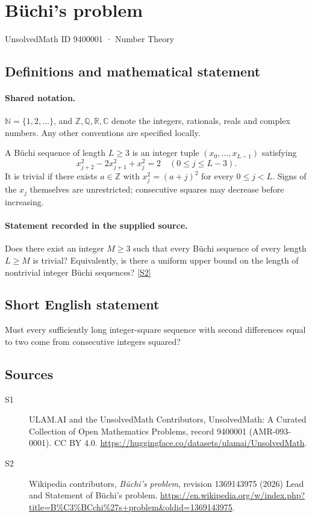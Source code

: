 \documentclass[11pt]{article}
\newcommand{\sref}[2]{\hyperlink{source:#1:#2}{[S#2]}}
\begin{document}
\setcounter{section}{9400000}
\section{Büchi's problem}\label{9400001}
{\small\sffamily UnsolvedMath ID 9400001 · Number Theory}
\subsection{Definitions and mathematical statement}

\paragraph{Shared notation.}$\mathbb N=\{1,2,\ldots\}$, and $\mathbb Z,\mathbb Q,\mathbb R,\mathbb C$ denote the integers, rationals, reals and complex numbers. Any other conventions are specified locally.


A B\"uchi sequence of length $L\ge3$ is an integer tuple $(x_0,\ldots,x_{L-1})$ satisfying
\[
x_{j+2}^2-2x_{j+1}^2+x_j^2=2\quad(0\le j\le L-3).
\]
It is trivial if there exists $a\in\mathbb Z$ with $x_j^2=(a+j)^2$ for every $0\le j<L$. Signs of the $x_j$ themselves are unrestricted; consecutive squares may decrease before increasing.
\paragraph{Statement recorded in the supplied source.}
Does there exist an integer $M\ge3$ such that every B\"uchi sequence of every length $L\ge M$ is trivial? Equivalently, is there a uniform upper bound on the length of nontrivial integer B\"uchi sequences? \sref{9400001}{2}
\subsection{Short English statement}
Must every sufficiently long integer-square sequence with second differences equal to two come from consecutive integers squared?
\subsection{Sources}
\begin{description}
\item[\hypertarget{source:9400001:1}{S1}] ULAM.AI and the UnsolvedMath Contributors, UnsolvedMath: A Curated Collection of Open Mathematics Problems, record 9400001 (AMR-093-0001). CC BY 4.0. \url{https://huggingface.co/datasets/ulamai/UnsolvedMath}.
\item[\hypertarget{source:9400001:2}{S2}] Wikipedia contributors, \emph{Büchi's problem}, revision 1369143975 (2026) Lead and Statement of Büchi’s problem. \url{https://en.wikipedia.org/w/index.php?title=B%C3%BCchi%27s+problem&oldid=1369143975}.
\end{description}
\label{end:9400001}
\end{document}
